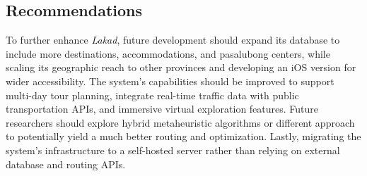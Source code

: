 \subsection{Recommendations}
To further enhance \textit{Lakad}, future development should expand its database to include more destinations, accommodations, and pasalubong centers, while scaling its geographic reach to other provinces and developing an iOS version for wider accessibility. The system’s capabilities should be improved to support multi-day tour planning, integrate real-time traffic data with public transportation APIs, and immersive virtual exploration features. Future researchers should explore hybrid metaheuristic algorithms or different approach to potentially yield a much better routing and optimization. Lastly, migrating the system’s infrastructure to a self-hosted server rather than relying on external database and routing APIs.

